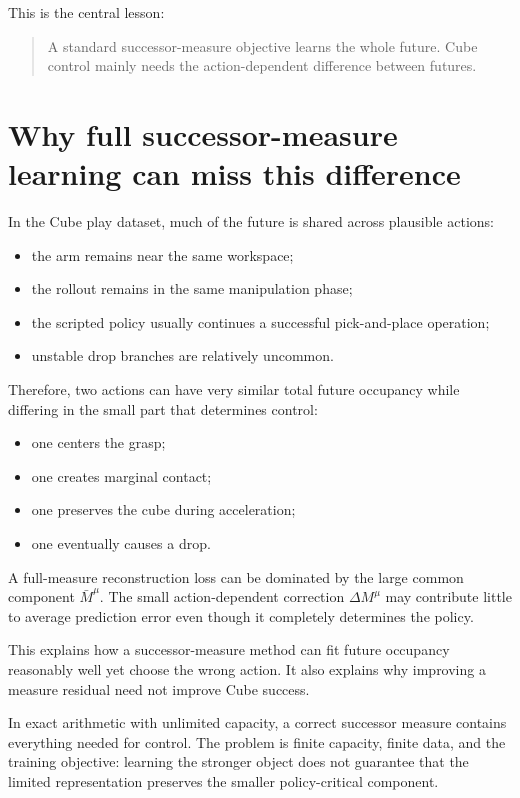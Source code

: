 \documentclass[12pt]{article}
\begin{document}
This is the central lesson:
\begin{quote}
A standard successor-measure objective learns the whole future. Cube control mainly needs the action-dependent difference between futures.
\end{quote}

\section*{Why full successor-measure learning can miss this difference}
In the Cube play dataset, much of the future is shared across plausible actions:
\begin{itemize}
    \item the arm remains near the same workspace;
    \item the rollout remains in the same manipulation phase;
    \item the scripted policy usually continues a successful pick-and-place operation;
    \item unstable drop branches are relatively uncommon.
\end{itemize}

Therefore, two actions can have very similar total future occupancy while differing in the small part that determines control:
\begin{itemize}
    \item one centers the grasp;
    \item one creates marginal contact;
    \item one preserves the cube during acceleration;
    \item one eventually causes a drop.
\end{itemize}

A full-measure reconstruction loss can be dominated by the large common component $\bar M^\mu$. The small action-dependent correction $\Delta M^\mu$ may contribute little to average prediction error even though it completely determines the policy.

This explains how a successor-measure method can fit future occupancy reasonably well yet choose the wrong action. It also explains why improving a measure residual need not improve Cube success.

In exact arithmetic with unlimited capacity, a correct successor measure contains everything needed for control. The problem is finite capacity, finite data, and the training objective: learning the stronger object does not guarantee that the limited representation preserves the smaller policy-critical component.
\end{document}
